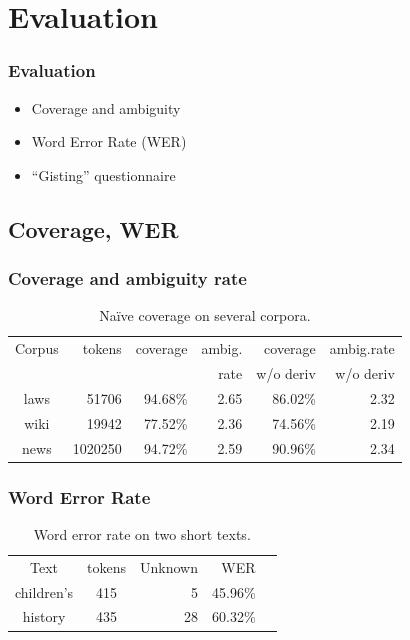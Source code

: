 \documentclass[notes=hide]{beamer}
\begin{document}
\section{Evaluation}
\begin{frame}\frametitle{Evaluation}
  \begin{itemize}
  \item Coverage and ambiguity
  \item Word Error Rate (WER)
  \item ``Gisting'' questionnaire
  \end{itemize}
\end{frame}

\subsection{Coverage, WER}
\begin{frame}\frametitle{Coverage and ambiguity rate}
  \begin{table}
    \begin{center}
      \begin{tabular}{crrrrr}
        Corpus     & tokens   & coverage & ambig.      & coverage   & ambig.rate  \\
        &          &          & rate        & w/o deriv  & w/o deriv \\
        laws       &  51706   & 94.68\%  & 2.65        & 86.02\%    & 2.32 \\
        wiki       & 19942    & 77.52\%  & 2.36        & 74.56\%    & 2.19 \\
        news       & 1020250  & 94.72\%  & 2.59        & 90.96\%    & 2.34 \\
      \end{tabular}
      \caption{Na\"{i}ve coverage on several corpora.}
      \label{table:cov}
    \end{center}
  \end{table}
\end{frame}

\begin{frame}\frametitle{Word Error Rate}
  \begin{table}
    \begin{center}
      \begin{tabular}{ccrrr}
        Text       & tokens & Unknown & WER  \\
        children's & 415     & 5      & 45.96\% \\
        history    & 435     & 28     & 60.32\%  \\
      \end{tabular}
      \caption{Word error rate on two short texts.}
      \label{table:wer}
    \end{center}
  \end{table}
\end{frame}
\end{document}
